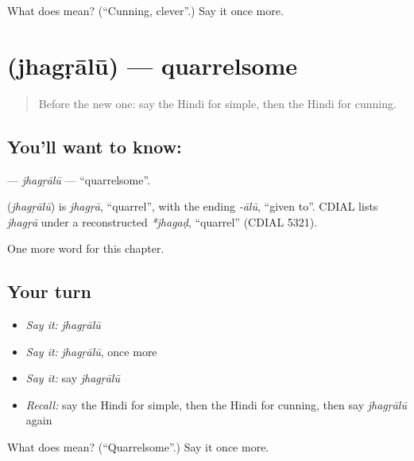 \begin{tcolorbox}[breakable,colback=teal!4,colframe=teal!35!black,title={Before you move on}]
What does  mean? (\textquotedblleft{}Cunning, clever\textquotedblright{}.) Say it once more.
\end{tcolorbox}
\section[\texorpdfstring{\hi{झगड़ालू} (jhagṛālū)}{झगड़ालू (jhagṛālū)}]{ (jhagṛālū) — quarrelsome}

\label{lesson:HI-C243-jhagralu}



\begin{quote}
Before the new one: say the Hindi for simple, then the Hindi for cunning.
\end{quote}

\subsection*{You'll want to know: }
\textbf{} — \emph{jhagṛālū} — \textquotedblleft{}quarrelsome\textquotedblright{}.

\begin{cousinweb}
\textbf{} (\emph{jhagṛālū}) is \emph{jhagṛā}, \textquotedblleft{}quarrel\textquotedblright{}, with the ending \emph{-ālū}, \textquotedblleft{}given to\textquotedblright{}. CDIAL lists \emph{jhagṛā} under a reconstructed \emph{*jhagaḍ}, \textquotedblleft{}quarrel\textquotedblright{} (CDIAL 5321).
\end{cousinweb}

\begin{grammarlens}[title={What you've built}]
One more word for this chapter.
\end{grammarlens}

\subsection*{Your turn}
\begin{itemize}
\raggedright
  \item \emph{Say it:} \emph{jhagṛālū}
  \item \emph{Say it:} \emph{jhagṛālū}, once more
  \item \emph{Say it:} say \emph{jhagṛālū}
  \item \emph{Recall:} say the Hindi for simple, then the Hindi for cunning, then say \emph{jhagṛālū} again
\end{itemize}

\begin{tcolorbox}[breakable,colback=teal!4,colframe=teal!35!black,title={Before you move on}]
What does  mean? (\textquotedblleft{}Quarrelsome\textquotedblright{}.) Say it once more.
\end{tcolorbox}
